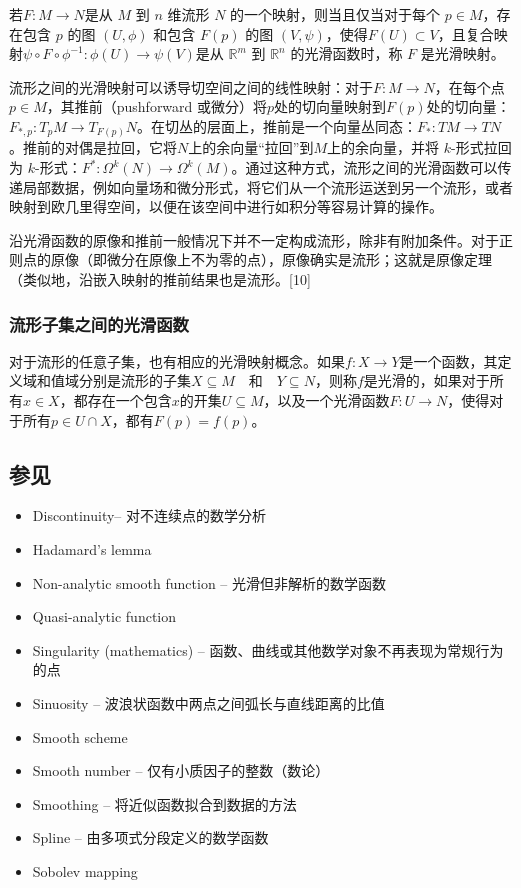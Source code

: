 若$F: M \to N$是从 $M$ 到 $n$ 维流形 $N$ 的一个映射，则当且仅当对于每个 $p \in M$，存在包含 $p$ 的图 $(U, \phi)$ 和包含 $F(p)$ 的图 $(V, \psi)$，使得$F(U) \subset V$，且复合映射$\psi \circ F \circ \phi^{-1} : \phi(U) \to \psi(V)$是从 $\mathbb{R}^m$ 到 $\mathbb{R}^n$ 的光滑函数时，称 $F$ 是光滑映射。

流形之间的光滑映射可以诱导切空间之间的线性映射：对于$F: M \to N$，在每个点 $p \in M$，其推前（pushforward 或微分）将$p$处的切向量映射到$F(p)$处的切向量：$F_{*,p}: T_p M \to T_{F(p)} N$。在切丛的层面上，推前是一个向量丛同态：$F_*: TM \to TN$。推前的对偶是拉回，它将$N$上的余向量“拉回”到$M$上的余向量，并将 $k$-形式拉回为 $k$-形式：$F^*: \Omega^k(N) \to \Omega^k(M)$。通过这种方式，流形之间的光滑函数可以传递局部数据，例如向量场和微分形式，将它们从一个流形运送到另一个流形，或者映射到欧几里得空间，以便在该空间中进行如积分等容易计算的操作。

沿光滑函数的原像和推前一般情况下并不一定构成流形，除非有附加条件。对于正则点的原像（即微分在原像上不为零的点），原像确实是流形；这就是原像定理（类似地，沿嵌入映射的推前结果也是流形。[10]
\subsubsection{流形子集之间的光滑函数}
对于流形的任意子集，也有相应的光滑映射概念。如果$f: X \to Y$是一个函数，其定义域和值域分别是流形的子集$X \subseteq M\quad \text{和} \quad Y \subseteq N$，则称$f$是光滑的，如果对于所有$x \in X$，都存在一个包含$x$的开集$U \subseteq M$，以及一个光滑函数$F: U \to N$，使得对于所有$p \in U \cap X$，都有$F(p) = f(p)$。
\subsection{参见}
\begin{itemize}
\item Discontinuity– 对不连续点的数学分析
\item Hadamard's lemma
\item Non-analytic smooth function – 光滑但非解析的数学函数
\item Quasi-analytic function
\item Singularity (mathematics) – 函数、曲线或其他数学对象不再表现为常规行为的点
\item Sinuosity – 波浪状函数中两点之间弧长与直线距离的比值
\item Smooth scheme
\item Smooth number – 仅有小质因子的整数（数论）
\item Smoothing – 将近似函数拟合到数据的方法
\item Spline – 由多项式分段定义的数学函数
\item Sobolev mapping
\end{itemize}
